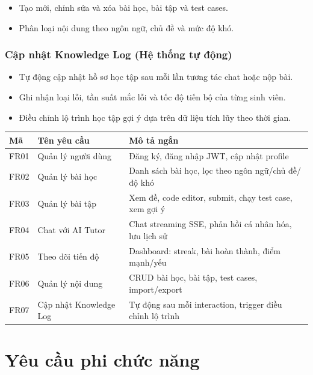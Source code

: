 \documentclass[../main.tex]{subfiles}
\begin{document}
\begin{itemize}
    \item Tạo mới, chỉnh sửa và xóa bài học, bài tập và test cases.
    \item Phân loại nội dung theo ngôn ngữ, chủ đề và mức độ khó.
\end{itemize}

\subsubsection{Cập nhật Knowledge Log (Hệ thống tự động)}

\begin{itemize}
    \item Tự động cập nhật hồ sơ học tập sau mỗi lần tương tác chat hoặc nộp bài.
    \item Ghi nhận loại lỗi, tần suất mắc lỗi và tốc độ tiến bộ của từng sinh viên.
    \item Điều chỉnh lộ trình học tập gợi ý dựa trên dữ liệu tích lũy theo thời gian.
\end{itemize}


{
\renewcommand{\arraystretch}{1.5}
\begin{tabularx}{\textwidth}{|p{2.0cm}|p{4cm}|X|}
\caption{Danh sách yêu cầu chức năng}
\label{tab:danh-sach-yeu-cau-chuc-nang}
\\
\hline
\textbf{Mã} & \textbf{Tên yêu cầu} & \textbf{Mô tả ngắn} \\
\hline
FR01 & Quản lý người dùng & Đăng ký, đăng nhập JWT, cập nhật profile \\
\hline
FR02 & Quản lý bài học & Danh sách bài học, lọc theo ngôn ngữ/chủ đề/độ khó \\
\hline
FR03 & Quản lý bài tập & Xem đề, code editor, submit, chạy test case, xem gợi ý \\
\hline
FR04 & Chat với AI Tutor & Chat streaming SSE, phản hồi cá nhân hóa, lưu lịch sử \\
\hline
FR05 & Theo dõi tiến độ & Dashboard: streak, bài hoàn thành, điểm mạnh/yếu \\
\hline
FR06 & Quản lý nội dung & CRUD bài học, bài tập, test cases, import/export \\
\hline
FR07 & Cập nhật Knowledge Log & Tự động sau mỗi interaction, trigger điều chỉnh lộ trình \\
\hline
\end{tabularx}
}

\section{Yêu cầu phi chức năng}
\end{document}
